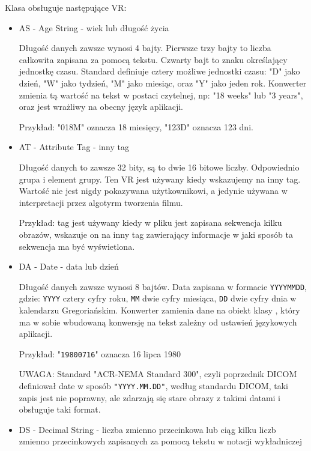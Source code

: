 Klasa obsługuje następujące VR:
\begin{itemize}
    \item AS - Age String - wiek lub długość życia

    Długość danych zawsze wynosi 4 bajty.
    Pierwsze trzy bajty to liczba całkowita zapisana za pomocą tekstu.
    Czwarty bajt to znaku określający jednostkę czasu.
    Standard definiuje cztery możliwe jednostki czasu: "D" jako dzień, "W" jako tydzień, "M" jako miesiąc, oraz "Y" jako jeden rok.
    Konwerter zmienia tą wartość na tekst w postaci czytelnej, np: "18 weeks" lub "3 years", oraz jest wrażliwy na obecny język aplikacji.
    
    Przykład: "018M" oznacza 18 miesięcy, "123D" oznacza 123 dni.

    \item AT - Attribute Tag - inny tag

    Długość danych to zawsze 32 bity, są to dwie 16 bitowe liczby.
    Odpowiednio grupa i element grupy.
    Ten VR jest używany kiedy wskazujemy na inny tag.
    Wartość nie jest nigdy pokazywana użytkownikowi, a jedynie używana w interpretacji przez algotyrm tworzenia filmu.
    
    Przykład: tag  jest używany kiedy w pliku jest zapisana sekwencja kilku obrazów, wskazuje on na inny tag zawierający informacje w jaki sposób ta sekwencja ma być wyświetlona.
    
    \item DA - Date - data lub dzień

    Długość danych zawsze wynosi 8 bajtów.
    Data zapisana w formacie \texttt{YYYYMMDD}, gdzie: \texttt{YYYY} cztery cyfry roku, \texttt{MM} dwie cyfry miesiąca, \texttt{DD} dwie cyfry dnia w kalendarzu Gregoriańskim.
    Konwerter zamienia dane na obiekt klasy , który ma w sobie wbudowaną konwersję na tekst zależny od ustawień językowych aplikacji.
    
    Przykład: "\texttt{19800716}" oznacza 16 lipca 1980
    
    UWAGA: Standard "ACR-NEMA Standard 300", czyli poprzednik DICOM definiował date w sposób \texttt{"YYYY.MM.DD"}, według standardu DICOM, taki zapis jest nie poprawny, ale zdarzają się stare obrazy z takimi datami i  obsługuje taki format.

    \item DS - Decimal String - liczba zmienno przecinkowa lub ciąg kilku liczb zmienno przecinkowych zapisanych za pomocą tekstu w notacji wykładniczej


\end{itemize}

